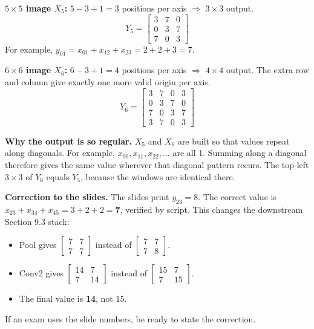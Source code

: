 \textbf{$5\times5$ image $X_5$:} $5-3+1 = 3$ positions per axis $\Rightarrow$ $3\times3$ output.
\[
Y_5 = \begin{bmatrix}3&7&0\\0&3&7\\7&0&3\end{bmatrix}
\]
For example, $y_{01} = x_{01} + x_{12} + x_{23} = 2+2+3 = 7$.

\textbf{$6\times6$ image $X_6$:} $6-3+1 = 4$ positions per axis $\Rightarrow$ $4\times4$ output. The extra row and column give exactly one more valid origin per axis.
\[
Y_6 = \begin{bmatrix}3&7&0&3\\0&3&7&0\\7&0&3&7\\3&7&0&3\end{bmatrix}
\]

\textbf{Why the output is so regular.} $X_5$ and $X_6$ are built so that values repeat along diagonals. For example, $x_{00}, x_{11}, x_{22}, \dots$ are all 1. Summing along a diagonal therefore gives the same value wherever that diagonal pattern recurs. The top-left $3\times3$ of $Y_6$ equals $Y_5$, because the windows are identical there.

\textbf{Correction to the slides.} The slides print $y_{23} = 8$. The correct value is $x_{23} + x_{34} + x_{45} = 3+2+2 = \mathbf{7}$, verified by script. This changes the downstream Section 9.3 stack:
\begin{itemize}[nosep]
  \item Pool gives $\begin{bmatrix}7&7\\7&7\end{bmatrix}$ instead of $\begin{bmatrix}7&7\\7&8\end{bmatrix}$.
  \item Conv2 gives $\begin{bmatrix}14&7\\7&14\end{bmatrix}$ instead of $\begin{bmatrix}15&7\\7&15\end{bmatrix}$.
  \item The final value is \textbf{14}, not 15.
\end{itemize}
If an exam uses the slide numbers, be ready to state the correction.


